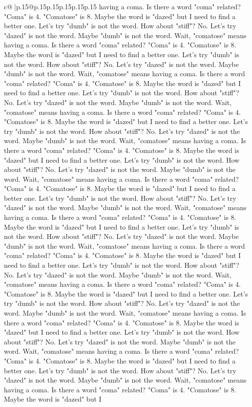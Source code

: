 \documentclass{article}
\begin{document}
{\begin{supertabular}{c@{$\;$}|p{.15\linewidth}@{}p{.15\linewidth}p{.15\linewidth}p{.15\linewidth}p{.15\linewidth}p{.15\linewidth}}
{{{having a coma. Is there a word "coma" related? "Coma" is 4. "Comatose" is 8. Maybe the word is "dazed" but I need to find a better one. Let's try "dumb" is not the word. How about "stiff"? No. Let's try "dazed" is not the word. Maybe "dumb" is not the word. Wait, "comatose" means having a coma. Is there a word "coma" related? "Coma" is 4. "Comatose" is 8. Maybe the word is "dazed" but I need to find a better one. Let's try "dumb" is not the word. How about "stiff"? No. Let's try "dazed" is not the word. Maybe "dumb" is not the word. Wait, "comatose" means having a coma. Is there a word "coma" related? "Coma" is 4. "Comatose" is 8. Maybe the word is "dazed" but I need to find a better one. Let's try "dumb" is not the word. How about "stiff"? No. Let's try "dazed" is not the word. Maybe "dumb" is not the word. Wait, "comatose" means having a coma. Is there a word "coma" related? "Coma" is 4. "Comatose" is 8. Maybe the word is "dazed" but I need to find a better one. Let's try "dumb" is not the word. How about "stiff"? No. Let's try "dazed" is not the word. Maybe "dumb" is not the word. Wait, "comatose" means having a coma. Is there a word "coma" related? "Coma" is 4. "Comatose" is 8. Maybe the word is "dazed" but I need to find a better one. Let's try "dumb" is not the word. How about "stiff"? No. Let's try "dazed" is not the word. Maybe "dumb" is not the word. Wait, "comatose" means having a coma. Is there a word "coma" related? "Coma" is 4. "Comatose" is 8. Maybe the word is "dazed" but I need to find a better one. Let's try "dumb" is not the word. How about "stiff"? No. Let's try "dazed" is not the word. Maybe "dumb" is not the word. Wait, "comatose" means having a coma. Is there a word "coma" related? "Coma" is 4. "Comatose" is 8. Maybe the word is "dazed" but I need to find a better one. Let's try "dumb" is not the word. How about "stiff"? No. Let's try "dazed" is not the word. Maybe "dumb" is not the word. Wait, "comatose" means having a coma. Is there a word "coma" related? "Coma" is 4. "Comatose" is 8. Maybe the word is "dazed" but I need to find a better one. Let's try "dumb" is not the word. How about "stiff"? No. Let's try "dazed" is not the word. Maybe "dumb" is not the word. Wait, "comatose" means having a coma. Is there a word "coma" related? "Coma" is 4. "Comatose" is 8. Maybe the word is "dazed" but I need to find a better one. Let's try "dumb" is not the word. How about "stiff"? No. Let's try "dazed" is not the word. Maybe "dumb" is not the word. Wait, "comatose" means having a coma. Is there a word "coma" related? "Coma" is 4. "Comatose" is 8. Maybe the word is "dazed" but I need to find a better one. Let's try "dumb" is not the word. How about "stiff"? No. Let's try "dazed" is not the word. Maybe "dumb" is not the word. Wait, "comatose" means having a coma. Is there a word "coma" related? "Coma" is 4. "Comatose" is 8. Maybe the word is "dazed" but I need to find a better one. Let's try "dumb" is not the word. How about "stiff"? No. Let's try "dazed" is not the word. Maybe "dumb" is not the word. Wait, "comatose" means having a coma. Is there a word "coma" related? "Coma" is 4. "Comatose" is 8. Maybe the word is "dazed" but I }}}
\end{supertabular}}
\end{document}
